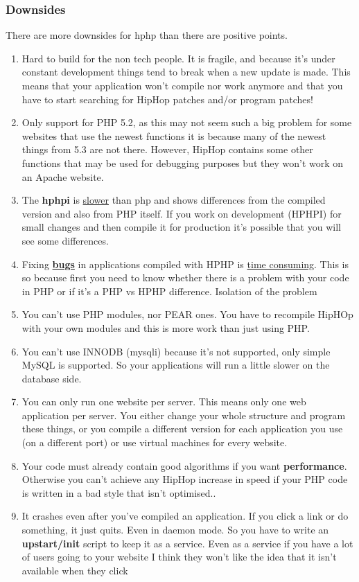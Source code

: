 \subsubsection{Downsides}
There are more downsides for \gls{hphp} than there are positive points.\cite{downsides_of_hiphop}
\begin{enumerate}
\item Hard to build for the non tech people. It is fragile, and because it's under constant
development things tend to break when a new update is made. This means that your application won't
compile nor work anymore and that you have to start searching for HipHop patches and/or program
patches!
\item Only support for PHP 5.2, as this may not seem such a big problem for some websites that use the
newest functions it is because many of the newest things from 5.3 are not there. 
However, HipHop contains some other functions that may be used for debugging purposes but they won't work on an Apache website.
\item The \textbf{\gls{hphpi}} is \underline{slower} than \gls{php} and shows differences from the compiled
version and also from PHP itself. If you work on development (HPHPI) for small changes and then
compile it for production it's possible that  you will see some differences.
\item Fixing \textbf{\underline{bugs}} in applications compiled with HPHP is \underline{time consuming}. This is so because first you
need to know whether there is a problem with your code in PHP or if it's a PHP vs HPHP difference.
Isolation of the problem
\item You can't use PHP modules, nor PEAR ones. You have to recompile HipHOp with your own
modules and this is more work than just using PHP.
\item You can't use INNODB (mysqli) because it's not supported, only simple MySQL is supported. So
your applications will run a little slower on the database side.
\item You can only run one website per server. This means only one web application per server. You
either change your whole structure and program these things, or you compile a different version for each
application you use (on a different port) or use virtual machines for every website.
\item Your code must already contain good algorithms if you want \textbf{performance}. 
Otherwise you can't achieve any HipHop increase in speed if your PHP code is written in a bad style that isn't optimised..\cite{php_performance}
\item It crashes even after you've compiled an application. If you click a link or do something, it just
quits. Even in daemon mode. So you have to write an \textbf{upstart/init} script to keep it as a
service. Even as a service if you have a lot of users going to your website I think they
won't like the idea that it isn't available when they click

\end{enumerate}

